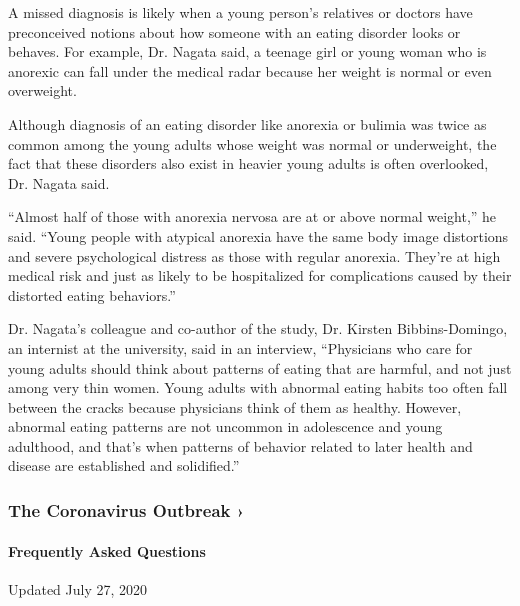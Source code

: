 A missed diagnosis is likely when a young person's relatives or doctors
have preconceived notions about how someone with an eating disorder
looks or behaves. For example, Dr. Nagata said, a teenage girl or young
woman who is anorexic can fall under the medical radar because her
weight is normal or even overweight.

Although diagnosis of an eating disorder like anorexia or bulimia was
twice as common among the young adults whose weight was normal or
underweight, the fact that these disorders also exist in heavier young
adults is often overlooked, Dr. Nagata said.

``Almost half of those with anorexia nervosa are at or above normal
weight,'' he said. ``Young people with atypical anorexia have the same
body image distortions and severe psychological distress as those with
regular anorexia. They're at high medical risk and just as likely to be
hospitalized for complications caused by their distorted eating
behaviors.''

Dr. Nagata's colleague and co-author of the study, Dr. Kirsten
Bibbins-Domingo, an internist at the university, said in an interview,
``Physicians who care for young adults should think about patterns of
eating that are harmful, and not just among very thin women. Young
adults with abnormal eating habits too often fall between the cracks
because physicians think of them as healthy. However, abnormal eating
patterns are not uncommon in adolescence and young adulthood, and that's
when patterns of behavior related to later health and disease are
established and solidified.''

\href{https://www.nytimes3xbfgragh.onion/news-event/coronavirus?action=click\&pgtype=Article\&state=default\&region=MAIN_CONTENT_3\&context=storylines_faq}{}

\hypertarget{the-coronavirus-outbreak-}{%
\subsubsection{The Coronavirus Outbreak
›}\label{the-coronavirus-outbreak-}}

\hypertarget{frequently-asked-questions}{%
\paragraph{Frequently Asked
Questions}\label{frequently-asked-questions}}

Updated July 27, 2020

